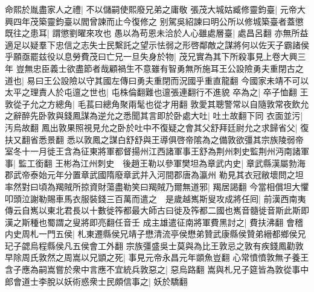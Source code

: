 命熙於胤盡家人之禮|{
	不以儲嗣使熙廢兄弟之庸敬}
張茂大城姑臧修靈鈞臺|{
	元帝大興四年茂築靈鈞臺以閻曾諫而止今復修之}
别駕吳紹諫曰明公所以修城築臺者蓋懲既往之患耳|{
	謂懲劉曜來攻也}
愚以為苟恩未洽於人心雖處層臺|{
	處昌呂翻}
亦無所益適足以疑羣下忠信之志失士民繫託之望示怯弱之形啓鄰敵之謀將何以佐天子霸諸侯乎願亟罷兹役以息勞費茂曰亡兄一旦失身於物|{
	茂兄實為其下所殺事見上卷大興三年}
豈無忠臣義士欲盡節者哉顧禍生不意雖有智勇無所施耳王公設險勇夫重閉古之道也|{
	易曰王公設險以守其國左傳曰勇夫重閉而況國乎重直龍翻}
今國家未靖不可以太平之理責人於屯邅之世也|{
	屯株倫翻難也邅張連翻行不進貌}
卒為之|{
	卒子恤翻}
王敦從子允之方總角|{
	毛萇曰總角聚兩髦也從才用翻}
敦愛其聰警常以自隨敦常夜飲允之辭醉先卧敦與錢鳳謀為逆允之悉聞其言即於卧處大吐|{
	吐土故翻下同}
衣面並污|{
	汚烏故翻}
鳳出敦果照視見允之卧於吐中不復疑之會其父舒拜廷尉允之求歸省父|{
	復扶又翻省悉景翻}
悉以敦鳳之謀白舒舒與王導俱啓帝隂為之備敦欲彊其宗族陵弱帝室冬十一月徙王含為征東將軍都督揚州江西諸軍事王舒為荆州刺史監荆州沔南諸軍事|{
	監工銜翻}
王彬為江州刺史　後趙王勒以參軍樊坦為章武内史|{
	章武縣漢屬勃海郡武帝泰始元年分置章武國隋廢章武并入河間郡唐為瀛州}
勒見其衣冠敝壞問之坦率然對曰頃為羯賊所掠資財蕩盡勒笑曰羯賊乃爾無道邪|{
	羯居謁翻}
今當相償坦大懼叩頭泣謝勒賜車馬衣服裝錢三百萬而遣之　是歲越嶲斯叟攻成將任囘|{
	前漢西南夷傳云自嶲以東北君長以十數徙筰都最大師古曰徙及筰都二國也嶲音髓徙音斯此斯即漢之斯種也蜀謂之叟將即亮翻任音壬}
成主雄遣征南將軍費黑討之|{
	費扶沸翻}
會稽内史周札一門五侯|{
	札東遷縣侯兄靖子懋清流亭侯懋弟贊武康縣侯贊弟縉都鄉侯兄玘子勰烏程縣侯凡五侯會工外翻}
宗族彊盛吳士莫與為比王敦忌之敦有疾錢鳳勸敦早除周氏敦然之周嵩以兄顗之死|{
	事見元帝永昌元年顗魚豈翻}
心常憤憤敦無子養王含子應為嗣嵩嘗於衆中言應不宜統兵敦惡之|{
	惡烏路翻}
嵩與札兄子筵皆為敦從事中郎會道士李脫以妖術惑衆士民頗信事之|{
	妖於驕翻}


